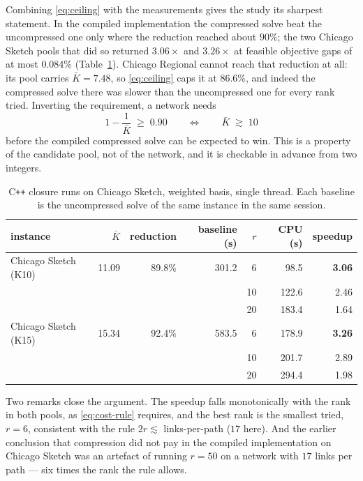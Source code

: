 \documentclass[11pt]{article}
\begin{document}
Combining \eqref{eq:ceiling} with the measurements gives the study its sharpest statement.
In the compiled implementation the compressed solve beat the uncompressed one only where the
reduction reached about $90\%$; the two Chicago Sketch pools that did so returned
$3.06\times$ and $3.26\times$ at feasible objective gaps of at most $0.084\%$
(Table~\ref{tab:cpp-closure}). Chicago Regional cannot reach that reduction at all: its pool
carries $\bar K=7.48$, so \eqref{eq:ceiling} caps it at $86.6\%$, and indeed the compressed
solve there was slower than the uncompressed one for every rank tried. Inverting the
requirement, a network needs
\[
1-\frac{1}{\bar K}\;\ge\;0.90 \qquad\Longleftrightarrow\qquad \bar K\;\gtrsim\;10
\]
before the compiled compressed solve can be expected to win. This is a property of the
candidate pool, not of the network, and it is checkable in advance from two integers.

\begin{table}[h]
\centering
\caption{C\texttt{++} closure runs on Chicago Sketch, weighted basis, single thread. Each
baseline is the uncompressed solve of the same instance in the same session.}
\label{tab:cpp-closure}
{\small
\begin{tabular}{lrrrrrr}
\toprule
instance & $\bar K$ & reduction & baseline (s) & $r$ & CPU (s) & speedup\\
\midrule
Chicago Sketch (K10) & 11.09 & 89.8\% & 301.2 & 6  & 98.5  & \textbf{3.06}\\
                     &       &        &       & 10 & 122.6 & 2.46\\
                     &       &        &       & 20 & 183.4 & 1.64\\
\midrule
Chicago Sketch (K15) & 15.34 & 92.4\% & 583.5 & 6  & 178.9 & \textbf{3.26}\\
                     &       &        &       & 10 & 201.7 & 2.89\\
                     &       &        &       & 20 & 294.4 & 1.98\\
\bottomrule
\end{tabular}}
\end{table}

Two remarks close the argument. The speedup falls monotonically with the rank in both pools,
as \eqref{eq:cost-rule} requires, and the best rank is the smallest tried, $r=6$, consistent
with the rule $2r\lesssim$ links-per-path ($17$ here). And the earlier conclusion that
compression did not pay in the compiled implementation on Chicago Sketch was an artefact of
running $r=50$ on a network with $17$ links per path --- six times the rank the rule allows.
\end{document}
